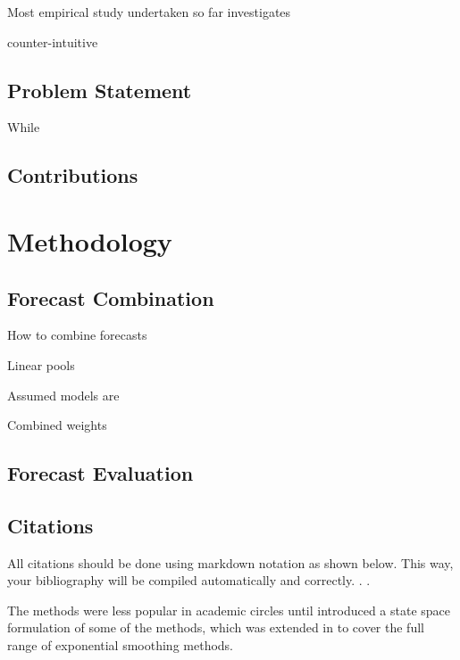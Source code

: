 \documentclass{monashthesis}
\begin{document}
Most empirical study undertaken so far investigates

counter-intuitive

\hypertarget{problem-statement}{%
\section{Problem Statement}\label{problem-statement}}

While

\hypertarget{contributions}{%
\section{Contributions}\label{contributions}}

\hypertarget{methodology}{%
\chapter{Methodology}\label{methodology}}

\hypertarget{forecast-combination}{%
\section{Forecast Combination}\label{forecast-combination}}

How to combine forecasts

Linear pools

Assumed models are

Combined weights

\hypertarget{forecast-evaluation}{%
\section{Forecast Evaluation}\label{forecast-evaluation}}

\hypertarget{citations}{%
\section{Citations}\label{citations}}

All citations should be done using markdown notation as shown below. This way, your bibliography will be compiled automatically and correctly. \autocite{FZMP23,BG69}.
\autocite[see][]{FZMP23}.

The methods were less popular in academic circles until \textcite{FZMP23} introduced a state space formulation of some of the methods, which was extended in \textcite{HKSG02} to cover the full range of exponential smoothing methods.
\end{document}
